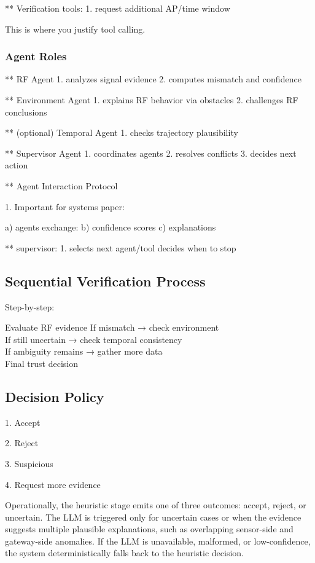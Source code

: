 \documentclass[10pt, twocolumn, letterpaper]{article}
\begin{document}
** Verification tools:
1. request additional AP/time window

This is where you justify tool calling.

\subsubsection{Agent Roles}
** RF Agent
1. analyzes signal evidence
2. computes mismatch and confidence


** Environment Agent
1. explains RF behavior via obstacles
2. challenges RF conclusions


** (optional) Temporal Agent
1. checks trajectory plausibility


** Supervisor Agent
1. coordinates agents
2. resolves conflicts
3. decides next action


** Agent Interaction Protocol

1. Important for systems paper:

a) agents exchange:
b) confidence scores
c) explanations


** supervisor:
1. selects next agent/tool
decides when to stop

\subsection{Sequential Verification Process}

Step-by-step:

Evaluate RF evidence
If mismatch → check environment\\

If still uncertain → check temporal consistency\\

If ambiguity remains → gather more data\\

Final trust decision\\


\subsection{Decision Policy}
1. Accept

2. Reject

3. Suspicious

4. Request more evidence

Operationally, the heuristic stage emits one of three outcomes: accept, reject, or uncertain. The LLM is triggered only for uncertain cases or when the evidence suggests multiple plausible explanations, such as overlapping sensor-side and gateway-side anomalies. If the LLM is unavailable, malformed, or low-confidence, the system deterministically falls back to the heuristic decision.
\end{document}
